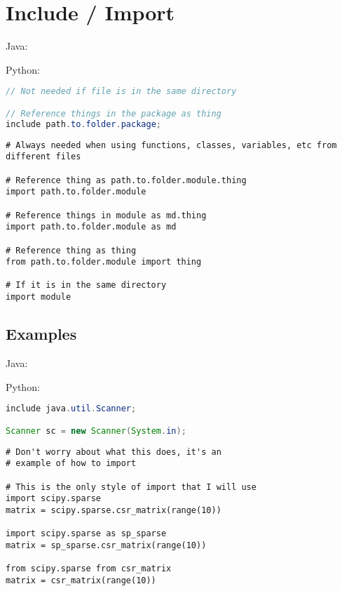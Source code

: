 \documentclass{article}
\begin{document}
\section{Include / Import}
\begin{minipage}{0.45\linewidth}
    Java:
\end{minipage}
\hfill
\begin{minipage}{0.45\linewidth}
    Python:
\end{minipage}

\begin{minipage}{0.45\linewidth}
    \begin{lstlisting}[language=Java]
// Not needed if file is in the same directory

// Reference things in the package as thing
include path.to.folder.package;
    \end{lstlisting}
\end{minipage}
\hfill
\begin{minipage}{0.45\linewidth}
    \begin{lstlisting}
# Always needed when using functions, classes, variables, etc from different files

# Reference thing as path.to.folder.module.thing
import path.to.folder.module

# Reference things in module as md.thing
import path.to.folder.module as md

# Reference thing as thing
from path.to.folder.module import thing

# If it is in the same directory
import module
    \end{lstlisting}
\end{minipage}

\subsection{Examples}
\begin{minipage}{0.45\linewidth}
    Java:
\end{minipage}
\hfill
\begin{minipage}{0.45\linewidth}
    Python:
\end{minipage}

\begin{minipage}{0.45\linewidth}
    \begin{lstlisting}[language=Java]
include java.util.Scanner;

Scanner sc = new Scanner(System.in);
    \end{lstlisting}
\end{minipage}
\hfill
\begin{minipage}{0.45\linewidth}
    \begin{lstlisting}
# Don't worry about what this does, it's an
# example of how to import

# This is the only style of import that I will use
import scipy.sparse
matrix = scipy.sparse.csr_matrix(range(10))

import scipy.sparse as sp_sparse
matrix = sp_sparse.csr_matrix(range(10))

from scipy.sparse from csr_matrix
matrix = csr_matrix(range(10))
    \end{lstlisting}
\end{minipage}
\end{document}

